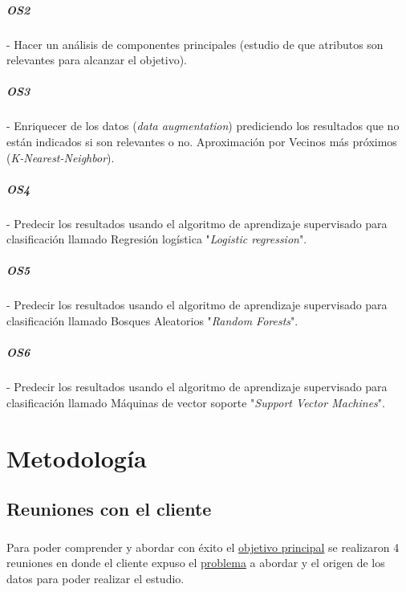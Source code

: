 \documentclass[10pt,a4paper,oneside]{book}
\begin{document}
\paragraph{OS2} - Hacer un análisis de componentes principales (estudio de que atributos son relevantes para alcanzar el objetivo).

\paragraph{OS3} - Enriquecer de los datos (\textit{data augmentation}) prediciendo los resultados que no están indicados si son relevantes o no. Aproximación por Vecinos más próximos (\textit{K-Nearest-Neighbor}).

\paragraph{OS4} - Predecir los resultados usando el algoritmo de aprendizaje supervisado para clasificación llamado Regresión logística "\textit{Logistic regression}".

\paragraph{OS5} - Predecir los resultados usando el algoritmo de aprendizaje supervisado para clasificación llamado Bosques Aleatorios "\textit{Random Forests}".

\paragraph{OS6} - Predecir los resultados usando el algoritmo de aprendizaje supervisado para clasificación llamado Máquinas de vector soporte "\textit{Support Vector Machines}".

\chapter{Metodología}

\section{Reuniones con el cliente}

\paragraph{}
Para poder comprender y abordar con éxito el \hyperref[op:OP1]{objetivo principal} se realizaron 4 reuniones en donde el cliente expuso el \hyperref[op:OP1]{problema} a abordar y el origen de los datos para poder realizar el estudio.
\end{document}
